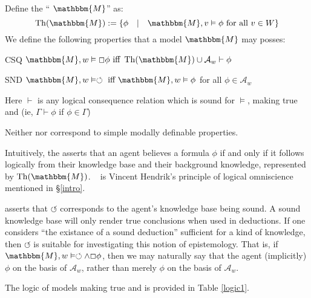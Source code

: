 \begin{definition}
  Define the `` $\mathbbm{M}$'' as:
  \[ \tmop{Th} (\mathbbm{M}) \assign \{\phi \hspace{1em} | \hspace{1em}
     \mathbbm{M}, v \vDash \phi \text{ for all } v \in W\} \]
  We define the following properties that a model $\mathbbm{M}$ may posses:
  
  \begin{descriptiondash}
    \item[CSQ] $\mathbbm{M}, w \vDash \Box \phi \text{ iff } \tmop{Th}
    (\mathbbm{M}) \cup \mathcal{A}_w \vdash \phi$
    
    \item[SND] $\mathbbm{M}, w \vDash \circlearrowleft \text{ iff }
    \mathbbm{M}, w \vDash \phi$ for all $\phi \in \mathcal{A}_w$
  \end{descriptiondash}
  
  Here $\vdash$ is any logical consequence relation which is sound for
  $\vDash$, making true  and  (ie,
  $\Gamma \vdash \phi$ if $\phi \in \Gamma$)
\end{definition}

Neither  nor  correspond to simple modally
definable properties.



Intuitively, the  asserts that an agent believes a formula
$\phi$ if and only if it follows logically from their knowledge base and their
background knowledge, represented by $\tmop{Th} (\mathbbm{M})$. \
 is Vincent Hendrik's principle of logical omniscience mentioned
in {\S}\ref{intro}.



 asserts that $\circlearrowleft$ corresponds to the agent's
knowledge base being sound. A sound knowledge base will only render true
conclusions when used in deductions.  If one considers ``the existance of a
sound deduction'' sufficient for a kind of knowledge, then $\circlearrowleft$
is suitable for investigating this notion of epistemology.  That is, if
$\mathbbm{M}, w \vDash \circlearrowleft \wedge \Box \phi$, then we may
naturally say that the agent (implicitly) {\tmem{knows}} $\phi$ on the basis
of $\mathcal{A}_w$, rather than merely {\tmem{believing}} $\phi$ on the basis
of $\mathcal{A}_w$.



The logic of models making true  and  is provided
in Table \ref{logic1}.

